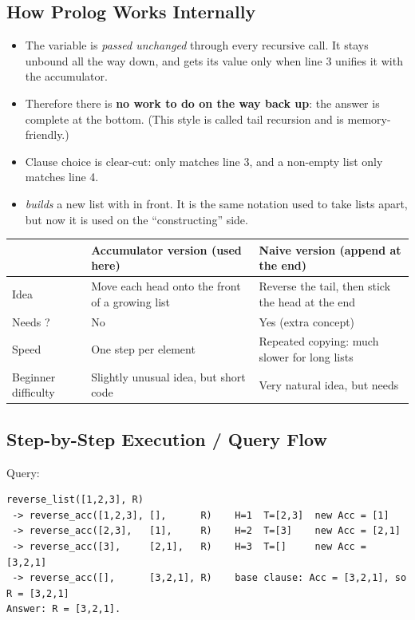 \documentclass[11pt,a4paper]{article}
\newcommand{\pred}[1]{\texttt{\detokenize{#1}}}
\begin{document}
\subsection{How Prolog Works Internally}
\begin{itemize}[leftmargin=*]
  \item The variable \pred{Output} is \emph{passed unchanged} through every recursive call. It stays unbound all the way down, and gets its value only when line 3 unifies it with the accumulator.
  \item Therefore there is \textbf{no work to do on the way back up}: the answer is complete at the bottom. (This style is called tail recursion and is memory-friendly.)
  \item Clause choice is clear-cut: \pred{[]} only matches line 3, and a non-empty list only matches line 4.
  \item \pred{[H|Acc]} \emph{builds} a new list with \pred{H} in front. It is the same notation used to take lists apart, but now it is used on the ``constructing'' side.
\end{itemize}

\begin{center}
\begin{tabularx}{\linewidth}{|l|X|X|}
\hline
 & \textbf{Accumulator version (used here)} & \textbf{Naive version (append at the end)}\\\hline
Idea & Move each head onto the front of a growing list & Reverse the tail, then stick the head at the end\\\hline
Needs \pred{append}? & No & Yes (extra concept)\\\hline
Speed & One step per element & Repeated copying: much slower for long lists\\\hline
Beginner difficulty & Slightly unusual idea, but short code & Very natural idea, but needs \pred{append/3}\\\hline
\end{tabularx}
\end{center}

\subsection{Step-by-Step Execution / Query Flow}
Query: \pred{?- reverse_list([1,2,3], R).}
\begin{lstlisting}[style=tr]
reverse_list([1,2,3], R)
 -> reverse_acc([1,2,3], [],      R)    H=1  T=[2,3]  new Acc = [1]
 -> reverse_acc([2,3],   [1],     R)    H=2  T=[3]    new Acc = [2,1]
 -> reverse_acc([3],     [2,1],   R)    H=3  T=[]     new Acc = [3,2,1]
 -> reverse_acc([],      [3,2,1], R)    base clause: Acc = [3,2,1], so R = [3,2,1]
Answer: R = [3,2,1].
\end{lstlisting}
\end{document}
